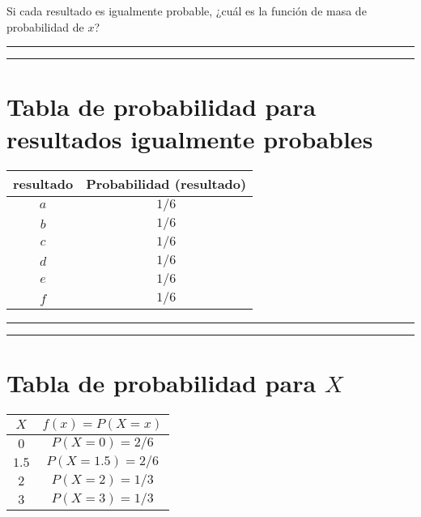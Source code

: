 \documentclass[
]{book}
\begin{document}
Si cada resultado es igualmente probable, ¿cuál es la función de masa de probabilidad de \(x\)?

\begin{center}\rule{0.5\linewidth}{0.5pt}\end{center}

\begin{center}\rule{0.5\linewidth}{0.5pt}\end{center}

\hypertarget{tabla-de-probabilidad-para-resultados-igualmente-probables}{%
\section{Tabla de probabilidad para resultados igualmente probables}\label{tabla-de-probabilidad-para-resultados-igualmente-probables}}

\begin{longtable}[]{@{}cc@{}}
\toprule
resultado & Probabilidad (resultado) \\
\midrule
\endhead
\(a\) & \(1/6\) \\
\(b\) & \(1/6\) \\
\(c\) & \(1/6\) \\
\(d\) & \(1/6\) \\
\(e\) & \(1/6\) \\
\(f\) & \(1/6\) \\
\bottomrule
\end{longtable}

\begin{center}\rule{0.5\linewidth}{0.5pt}\end{center}

\begin{center}\rule{0.5\linewidth}{0.5pt}\end{center}

\hypertarget{tabla-de-probabilidad-para-x}{%
\section{\texorpdfstring{Tabla de probabilidad para \(X\)}{Tabla de probabilidad para X}}\label{tabla-de-probabilidad-para-x}}

\begin{longtable}[]{@{}cc@{}}
\toprule
\(X\) & \(f(x)=P(X=x)\) \\
\midrule
\endhead
\(0\) & \(P(X=0)=2/6\) \\
\(1.5\) & \(P(X=1.5)=2/6\) \\
\(2\) & \(P(X=2)=1/3\) \\
\(3\) & \(P(X=3)=1/3\) \\
\bottomrule
\end{longtable}
\end{document}

